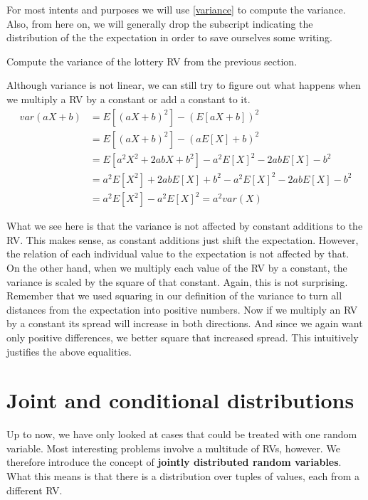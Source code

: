 \documentclass[a4paper,11pt,leqno]{report}
\begin{document}
For most intents and purposes we will use \ref{variance} to compute the variance. Also, from here on, we will generally drop the 
subscript indicating the distribution of the the expectation in order to save ourselves some writing.

\begin{Exercise}
Compute the variance of the lottery RV from the previous section.
\end{Exercise}

Although variance is not linear, we can still try to figure out what happens when we multiply a RV by a constant or add a constant to it.
\begin{align}
var(aX+b) &= E[(aX+b)^{2}] - (E[aX+b])^{2} \\
&= E[(aX+b)^{2}] - (aE[X]+b)^{2} \\
&= E[a^{2}X^{2} + 2abX + b^{2}] - a^{2}E[X]^{2} - 2abE[X] - b^{2} \\
&= a^{2}E[X^{2}] + 2abE[X] + b^{2} - a^{2}E[X]^{2} - 2abE[X] - b^{2} \\
&= a^{2}E[X^{2}] - a^{2}E[X]^{2} = a^{2}var(X) \
\end{align}

What we see here is that the variance is not affected by constant additions to the RV. This makes sense, as constant additions just shift
the expectation. However, the relation of each individual value to the expectation is not affected by that. On the other hand,
when we multiply each value of the RV by a constant, the variance is scaled by the square of that constant. Again, this is not surprising.
Remember that we used squaring in our definition of the variance to turn all distances from the expectation into positive numbers.
Now if we multiply an RV by a constant its spread will increase in both directions. And since we again want only positive differences,
we better square that increased spread. This intuitively justifies the above equalities.



\section{Joint and conditional distributions}

Up to now, we have only looked at cases that could be treated with one random variable. Most interesting problems involve a multitude
of RVs, however. We therefore introduce the concept of \textbf{jointly distributed random variables}. What this means is that
there is a distribution over tuples of values, each from a different RV.
\end{document}
